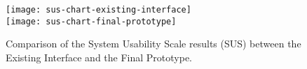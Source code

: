   \begin{figure}[tb]
    \centering
      {\texttt{[image: sus-chart-existing-interface]}}%
      \\
    {\texttt{[image: sus-chart-final-prototype]}}%
  \caption{Comparison of the System Usability Scale results (SUS) between the Existing Interface and the Final Prototype.}
    \label{fig:susChartComparison}
  \end{figure}
  

